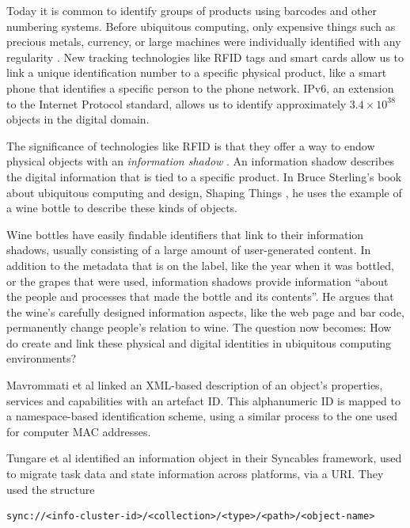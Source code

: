 Today it is common to identify groups of products using barcodes and other numbering systems. Before ubiquitous computing, only expensive things such as precious metals, currency, or large machines were individually identified with any regularity \cite{Kuniavsky}. New tracking technologies like \ac{RFID} tags and smart cards allow us to link a unique identification number to a specific physical product, like a smart phone that identifies a specific person to the phone network. IPv6, an extension to the Internet Protocol standard, allows us to identify approximately $3.4 \times 10^{38} $ objects in the digital domain.

The significance of technologies like \ac{RFID} is that they offer a way to endow physical objects with an \emph{information shadow} \cite{Greenfield2006}. An information shadow describes the digital information that is tied to a specific product.  In Bruce Sterling's book about ubiquitous computing and design, Shaping Things \cite{Sterling2005}, he uses the example of a wine bottle to describe these kinds of objects. 

Wine bottles have easily findable identifiers that link to their information shadows, usually consisting of a large amount of user-generated content. In addition to the metadata that is on the label, like the year when it was bottled, or the grapes that were used, information shadows provide information ``about the people and processes that made the bottle and its contents''. He argues that the wine's carefully designed information aspects, like the web page and bar code, permanently change people's relation to wine. The question now becomes: How do create and link these physical and digital identities in ubiquitous computing environments?


Mavrommati et al \cite{Mavrommati2004} linked an XML-based description of an object's properties, services and capabilities with an artefact ID. This alphanumeric ID is mapped to a namespace-based identification scheme, using a similar process to the one used for computer MAC addresses.

Tungare et al \cite{Tungare2007} identified an information object in their Syncables framework, used to migrate task data and state information across platforms, via a \ac{URI}. They used the structure 

\begin{verbatim}
sync://<info-cluster-id>/<collection>/<type>/<path>/<object-name>	
\end{verbatim}

